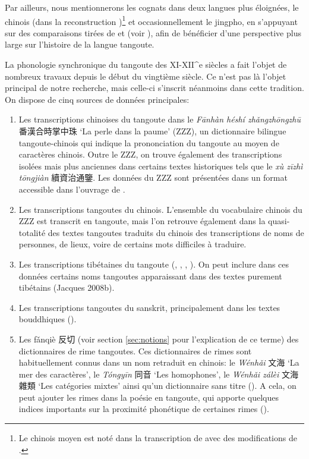\documentclass[oldfontcommands,twoside,a4paper,11pt,draft]{memoir}
\newcommand{\ipa}[1]{{\phon #1}} %
\newcommand{\zh}[1]{{\cn #1}}
\begin{document}
 Par ailleurs, nous mentionnerons les cognats dans deux langues plus éloignées, le chinois (dans la reconstruction \citealt{bs13oc})\footnote{Le chinois moyen est noté dans la transcription de \citet{baxter92} avec des modifications de \citealt{bs13oc}.} et occasionnellement le jingpho, en s'appuyant sur des comparaisons tirées de \citet{matisoff03} et \citet{peiros96st} (voir \citealt{xu83jingpo}), afin de bénéficier d'une perspective plus large sur l'histoire de la langue tangoute.

La phonologie synchronique du tangoute des XI-XII^{e} siècles a fait l'objet de nombreux travaux depuis le début du vingtième siècle. Ce n'est pas là l'objet principal de notre recherche, mais celle-ci s'inscrit néanmoins dans cette tradition. On dispose de cinq sources de données principales:
\begin{enumerate}
\item Les transcriptions chinoises du tangoute dans le \textit{Fānhàn héshí zhǎngzhōngzhū} \zh{番漢合時掌中珠} `La perle dans la paume' (ZZZ), un dictionnaire bilingue tangoute-chinois qui indique la prononciation du tangoute au moyen de caractères chinois. Outre le ZZZ, on trouve également des transcriptions isolées mais plus anciennes dans certains textes historiques tels que le \textit{xù zīzhì tōngjiàn} \zh{續資治通鑒}. Les données du ZZZ sont présentées dans un format accessible dans l'ouvrage de \citet{lifw94zzz}.
\item Les transcriptions tangoutes du chinois. L'ensemble du vocabulaire chinois du ZZZ est transcrit en tangoute, mais l'on retrouve également  dans la quasi-totalité des textes tangoutes traduits du chinois des transcriptions  de noms de personnes, de lieux, voire de certains mots difficiles à traduire.
\item Les transcriptions tibétaines du tangoute (\citealt{nevskij26}, \citealt{nie86qianjiazi}, \citealt{arakawa99}, \citealt{tai08duiyin}). On peut inclure dans ces données certains noms tangoutes apparaissant dans des textes purement tibétains (Jacques 2008b).
\item Les transcriptions tangoutes du sanskrit, principalement dans les textes bouddhiques (\citealt{arakawa97}).
\item Les \ipa{fǎnqiè} \zh{反切} (voir section \ref{sec:notions} pour l'explication de ce terme) des dictionnaires de rime tangoutes. Ces dictionnaires de rimes sont habituellement connus dans un nom retraduit en chinois: le \textit{Wénhǎi} \zh{文海} `La mer des caractères', le \textit{Tóngyīn} \zh{同音} `Les homophones', le \textit{Wénhǎi zálèi} \zh{文海雜類} `Les catégories mixtes' ainsi qu'un dictionnaire sans titre (\citealt[85-89]{sofronov68a}). A cela, on peut ajouter les rimes dans la poésie en tangoute, qui apporte quelques indices importants sur la proximité phonétique de certaines rimes (\citealt{arakawa01}).
\end{enumerate}
\end{document}
